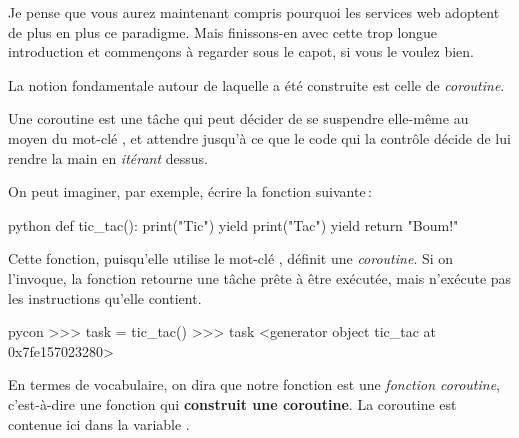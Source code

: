 \documentclass[small]{zmdocument}
\begin{document}
Je pense que vous aurez maintenant compris pourquoi les services web adoptent de plus en plus ce paradigme. Mais finissons-en avec cette trop longue introduction et commençons à regarder sous le capot, si vous le voulez bien.



La notion fondamentale autour de laquelle  a été construite est celle
de \textit{coroutine}.



Une coroutine est une tâche qui peut décider de se suspendre elle-même au moyen
du mot-clé , et attendre jusqu’à ce que le code qui la contrôle décide
de lui rendre la main en \textit{itérant} dessus.



On peut imaginer, par exemple, écrire la fonction suivante :



\begin{CodeBlock}{python}
def tic_tac():
    print("Tic")
    yield
    print("Tac")
    yield
    return "Boum!"
\end{CodeBlock}



Cette fonction, puisqu’elle utilise le mot-clé , définit une
\textit{coroutine}\textsuperscript{\footnotemark[1]}. Si on l’invoque, la fonction  retourne une
tâche prête à être exécutée, mais n’exécute pas les instructions qu’elle
contient.




\begin{CodeBlock}{pycon}
>>> task = tic_tac()
>>> task
<generator object tic_tac at 0x7fe157023280>
\end{CodeBlock}



En termes de vocabulaire, on dira que notre fonction  est une
\textit{fonction coroutine}, c’est-à-dire une fonction qui \textbf{construit une
coroutine}. La coroutine est contenue ici dans la variable .
\end{document}
